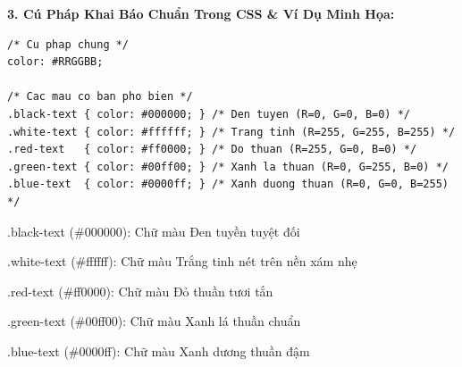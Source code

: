 \documentclass[11pt,oneside]{book}
\begin{document}
\textbf{3. Cú Pháp Khai Báo Chuẩn Trong CSS \& Ví Dụ Minh Họa:}
\begin{codeWindow}
\begin{lstlisting}[language=CSS3]
/* Cu phap chung */
color: #RRGGBB;

/* Cac mau co ban pho bien */
.black-text { color: #000000; } /* Den tuyen (R=0, G=0, B=0) */
.white-text { color: #ffffff; } /* Trang tinh (R=255, G=255, B=255) */
.red-text   { color: #ff0000; } /* Do thuan (R=255, G=0, B=0) */
.green-text { color: #00ff00; } /* Xanh la thuan (R=0, G=255, B=0) */
.blue-text  { color: #0000ff; } /* Xanh duong thuan (R=0, G=0, B=255) */
\end{lstlisting}
\end{codeWindow}

\begin{browserWindow}
\vspace{2pt}
\begin{tcolorbox}[
    enhanced,
    colback=white,
    colframe=gray!30,
    arc=4pt, boxrule=0.6pt,
    top=8pt, bottom=8pt, left=10pt, right=10pt
]
  \begin{tcolorbox}[colback=black, colframe=black, arc=3pt, boxrule=0.4pt, top=4pt, bottom=4pt, left=8pt, right=8pt, fontupper=\sffamily\bfseries\color{white}]
    .black-text (\#000000): Chữ màu Đen tuyền tuyệt đối
  \end{tcolorbox}
  \vspace{3pt}
  \begin{tcolorbox}[colback=white, colframe=gray!40, arc=3pt, boxrule=0.4pt, top=4pt, bottom=4pt, left=8pt, right=8pt, fontupper=\sffamily\bfseries\color{black}]
    .white-text (\#ffffff): Chữ màu Trắng tinh nét trên nền xám nhẹ
  \end{tcolorbox}
  \vspace{3pt}
  \begin{tcolorbox}[colback=red!10, colframe=red!60, arc=3pt, boxrule=0.4pt, top=4pt, bottom=4pt, left=8pt, right=8pt, fontupper=\sffamily\bfseries\color{red!80!black}]
    .red-text (\#ff0000): Chữ màu Đỏ thuần tươi tắn
  \end{tcolorbox}
  \vspace{3pt}
  \begin{tcolorbox}[colback=green!10, colframe=green!60!black, arc=3pt, boxrule=0.4pt, top=4pt, bottom=4pt, left=8pt, right=8pt, fontupper=\sffamily\bfseries\color{green!50!black}]
    .green-text (\#00ff00): Chữ màu Xanh lá thuần chuẩn
  \end{tcolorbox}
  \vspace{3pt}
  \begin{tcolorbox}[colback=blue!10, colframe=blue!60, arc=3pt, boxrule=0.4pt, top=4pt, bottom=4pt, left=8pt, right=8pt, fontupper=\sffamily\bfseries\color{blue!80!black}]
    .blue-text (\#0000ff): Chữ màu Xanh dương thuần đậm
  \end{tcolorbox}
\end{tcolorbox}
\end{browserWindow}
\end{document}
